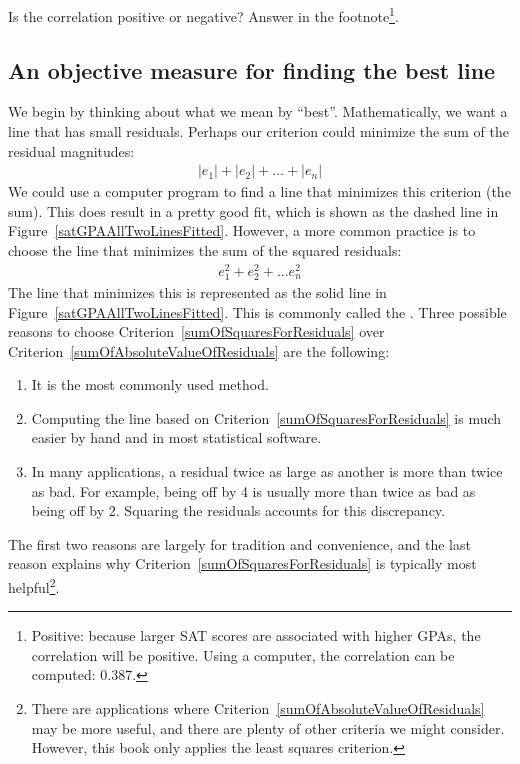 \begin{exercise}
Is the correlation positive or negative? Answer in the footnote\footnote{Positive: because larger SAT scores are associated with higher GPAs, the correlation will be positive. Using a computer, the correlation can be computed: 0.387.}.
\end{exercise}

\subsection{An objective measure for finding the best line}

We begin by thinking about what we mean by ``best''. Mathematically, we want a line that has small residuals. Perhaps our criterion could minimize the sum of the residual magnitudes:
\begin{eqnarray}
|e_1| + |e_2| + \dots + |e_n|
\label{sumOfAbsoluteValueOfResiduals}
\end{eqnarray}
We could use a computer program to find a line that minimizes this criterion (the sum). This does result in a pretty good fit, which is shown as the dashed line in Figure~\ref{satGPAAllTwoLinesFitted}. However, a more common practice is to choose the line that minimizes the sum of the squared residuals:
\begin{eqnarray}
e_{1}^2 + e_{2}^2 + \dots e_{n}^2
\label{sumOfSquaresForResiduals}
\end{eqnarray}
The line that minimizes this  is represented as the solid line in Figure~\ref{satGPAAllTwoLinesFitted}. This is commonly called the . Three possible reasons to choose Criterion~\eqref{sumOfSquaresForResiduals} over Criterion~\eqref{sumOfAbsoluteValueOfResiduals} are the following:
\begin{enumerate}
\item It is the most commonly used method.
\item Computing the line based on Criterion~\eqref{sumOfSquaresForResiduals} is much easier by hand and in most statistical software.
\item In many applications, a residual twice as large as another is more than twice as bad. For example, being off by 4 is usually more than twice as bad as being off by 2. Squaring the residuals accounts for this discrepancy.
\end{enumerate}
The first two reasons are largely for tradition and convenience, and the last reason explains why Criterion~\eqref{sumOfSquaresForResiduals} is typically most helpful\footnote{There are applications where Criterion~\eqref{sumOfAbsoluteValueOfResiduals} may be more useful, and there are plenty of other criteria we might consider. However, this book only applies the least squares criterion.}.

